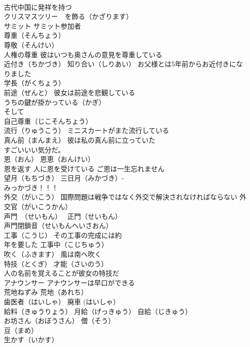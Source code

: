 \documentclass[8pt]{extreport}
\begin{document}
\begin{CJK}{UTF8}{min}
\\	古代中国に発祥を持つ
\\	クリスマスツリー　を飾る（かざります）
\\	サミット サミット参加者
\\	尊重（そんちょう）
\\	尊敬（そんけい）
\\	人権の尊重 彼はいつも奥さんの意見を尊重している
\\	近付き（ちかづき） 知り合い（しりあい） お父様とは5年前からお近付きになりました
\\	学長（がくちょう）
\\	前途（ぜんと） 彼女は前途を悲観している
\\	うちの鍵が掛かっている（かぎ）
\\	そして
\\	自己尊重（じこそんちょう）
\\	流行（りゅうこう） ミニスカートがまた流行している
\\	真ん前（まんまえ） 彼は私の真ん前に立っていた
\\	すごいいい気分だ。
\\	恩（おん） 恩恵（おんけい）
\\	恩を返す 人に恩を受けている ご恩は一生忘れません
\\	望月（もちづき） 三日月（みかづき）- 
\\	みっかづき！！！
\\	外交（がいこう） 国際問題は戦争ではなく外交で解決されなければならない 外交官（がいこうかん）
\\	声門　（せいもん）　 正門（せいもん）　
\\	声門閉鎖音（せいもんへいさおん）
\\	工事（こうじ） その工事の完成には約 
\\	年を要した 工事中（こじちゅう）
\\	吹く（ふきます） 風は南へ吹く
\\	特技（とくぎ） 才能（さいのう） 
\\	人の名前を覚えることが彼女の特技だ
\\	アナウンサー アナウンサーは早口ができる
\\	荒地ねずみ 荒地（あれち）
\\	歯医者（はいしゃ） 廃車 (はいしゃ）
\\	給料（きゅうりょう） 月給（げっきゅう） 自給（じきゅう）
\\	お坊さん（おぼうさん） 僧（そう）
\\	豆（まめ）
\\	生かす（いかす） 

\end{CJK}
\end{document}
